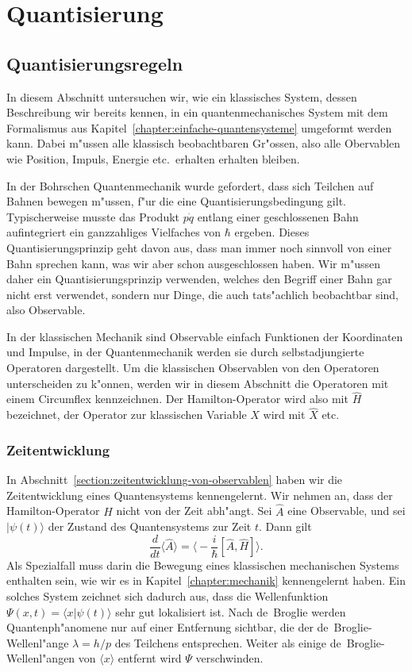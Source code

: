 \chapter{Quantisierung\label{chapter:quantisierung}}
\rhead{}

\section{Quantisierungsregeln}
In diesem Abschnitt untersuchen wir, wie ein klassisches System, dessen
Beschreibung wir bereits kennen, in ein quantenmechanisches System 
mit dem Formalismus aus Kapitel~\ref{chapter:einfache-quantensysteme}
umgeformt werden kann.
Dabei m"ussen alle klassisch beobachtbaren Gr"ossen, also alle Obervablen
wie Position, Impuls, Energie etc.~erhalten erhalten bleiben.

In der Bohrschen Quantenmechanik wurde gefordert, dass 
sich Teilchen auf Bahnen bewegen m"ussen, f"ur die eine
Quantisierungsbedingung gilt.
Typischerweise musste das Produkt $p\dot q$ entlang einer geschlossenen
Bahn aufintegriert ein ganzzahliges Vielfaches von $\hbar$ ergeben.
Dieses Quantisierungsprinzip geht davon aus, dass man immer noch sinnvoll
von einer Bahn sprechen kann, was wir aber schon ausgeschlossen haben.
Wir m"ussen daher ein Quantisierungsprinzip verwenden, welches den
Begriff einer Bahn gar nicht erst verwendet, sondern nur Dinge, die
auch tats"achlich beobachtbar sind, also Observable.

In der klassischen Mechanik sind Observable einfach Funktionen
der Koordinaten und Impulse,
in der Quantenmechanik werden sie durch selbstadjungierte
Operatoren dargestellt.
Um die klassischen Observablen von den Operatoren unterscheiden zu
k"onnen, werden wir in diesem Abschnitt die Operatoren mit einem
Circumflex kennzeichnen.
Der Hamilton-Operator wird also mit $\hat H$ bezeichnet, 
der Operator zur klassischen Variable $X$ wird mit $\hat X$ etc.

\subsection{Zeitentwicklung}
In Abschnitt~\ref{section:zeitentwicklung-von-observablen} haben wir die
Zeitentwicklung eines Quantensystems kennengelernt.
Wir nehmen an, dass der Hamilton-Operator $H$ nicht von der Zeit abh"angt.
Sei $\hat A$ eine Observable, und sei $|\psi(t)\rangle$ der Zustand des
Quantensystems zur Zeit $t$.
Dann gilt
\[
\frac{d}{dt}\langle \hat A\rangle
=
\biggl\langle -\frac{i}{\hbar}[\hat A,\hat H] \biggr\rangle.
\]
Als Spezialfall muss darin die Bewegung eines klassischen mechanischen Systems
enthalten sein, wie wir es in Kapitel~\ref{chapter:mechanik}
kennengelernt haben.
Ein solches System zeichnet sich dadurch aus, dass die Wellenfunktion
$\Psi(x,t)=\langle x|\psi(t)\rangle$
sehr gut lokalisiert ist.
Nach de~Broglie werden Quantenph"anomene nur auf einer Entfernung sichtbar,
die der de~Broglie-Wellenl"ange $\lambda=h/p$ des Teilchens entsprechen.
Weiter als einige de~Broglie-Wellenl"angen von $\langle x\rangle$
entfernt wird $\Psi$ verschwinden.

